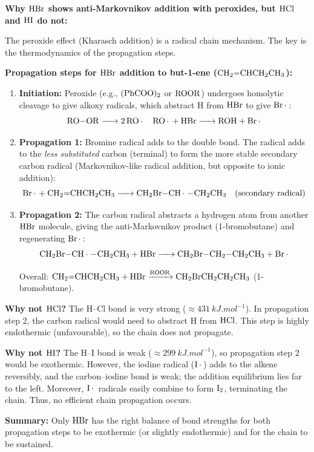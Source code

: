 \documentclass[11pt]{article}
\begin{document}
\begin{corrige}
\textbf{Why \(\ce{HBr}\) shows anti-Markovnikov addition with peroxides, but \(\ce{HCl}\) and \(\ce{HI}\) do not:}

The peroxide effect (Kharasch addition) is a radical chain mechanism. The key is the thermodynamics of the propagation steps.

\textbf{Propagation steps for \(\ce{HBr}\) addition to but-1-ene (\(\ce{CH2=CHCH2CH3}\)):}

\begin{enumerate}
\item \textbf{Initiation:} Peroxide (e.g., \(\ce{(PhCOO)2}\) or \(\ce{ROOR}\)) undergoes homolytic cleavage to give alkoxy radicals, which abstract H from \(\ce{HBr}\) to give \(\ce{Br.}\):
\[
\ce{RO-OR -> 2 RO.} \quad \ce{RO. + HBr -> ROH + Br.}
\]

\item \textbf{Propagation 1:} Bromine radical adds to the double bond. The radical adds to the \emph{less substituted} carbon (terminal) to form the more stable secondary carbon radical (Markovnikov-like radical addition, but opposite to ionic addition):
\[
\ce{Br. + CH2=CHCH2CH3 -> CH2Br-CH. -CH2CH3} \quad (\text{secondary radical})
\]

\item \textbf{Propagation 2:} The carbon radical abstracts a hydrogen atom from another \(\ce{HBr}\) molecule, giving the anti-Markovnikov product (1-bromobutane) and regenerating \(\ce{Br.}\):
\[
\ce{CH2Br-CH. -CH2CH3 + HBr -> CH2Br-CH2-CH2CH3 + Br.}
\]

Overall: \(\ce{CH2=CHCH2CH3 + HBr ->[ROOR] CH2BrCH2CH2CH3}\) (1-bromobutane).
\end{enumerate}

\textbf{Why not \(\ce{HCl}\)?} The H–Cl bond is very strong (\(\approx \SI{431}{kJ.mol^{-1}}\)). In propagation step 2, the carbon radical would need to abstract H from \(\ce{HCl}\). This step is highly endothermic (unfavourable), so the chain does not propagate.

\textbf{Why not \(\ce{HI}\)?} The H–I bond is weak (\(\approx \SI{299}{kJ.mol^{-1}}\)), so propagation step 2 would be exothermic. However, the iodine radical (\(\ce{I.}\)) adds to the alkene reversibly, and the carbon–iodine bond is weak; the addition equilibrium lies far to the left. Moreover, \(\ce{I.}\) radicals easily combine to form \(\ce{I2}\), terminating the chain. Thus, no efficient chain propagation occurs.

\textbf{Summary:} Only \(\ce{HBr}\) has the right balance of bond strengths for both propagation steps to be exothermic (or slightly endothermic) and for the chain to be sustained.
\end{corrige}
\end{document}
